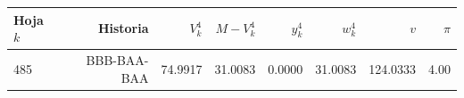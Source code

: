 {\small
\begin{tabular}{lrrrrrrr}
\toprule
Hoja $k$ & Historia & $V^4_k$ & $M-V^4_k$ & $y^4_k$ & $w^4_k$ & $v$ & $\pi$ \\
\midrule
485 & BBB-BAA-BAA & 74.9917 & 31.0083 & 0.0000 & 31.0083 & 124.0333 & 4.00 \\
\bottomrule
\end{tabular}
}
